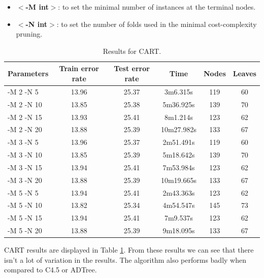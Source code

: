 \documentclass[a4paper]{llncs}
\begin{document}
\begin{itemize}
  \item \textbf{$<$-M int$>$}: to set the minimal number of instances at the terminal nodes.
  \item \textbf{$<$-N int$>$}: to set the number of folds used in the minimal cost-complexity pruning.
\end{itemize}

\begin{table}[ht]
  \begin{center}
  \begin{tabular}{ | l | c | c | c | c | c |}
    \hline
    \textbf{Parameters} & \textbf{Train error rate} & \textbf{Test error rate} & \textbf{Time} & \textbf{Nodes} & \textbf{Leaves} \\ \hline
    -M 2 -N 5 & 13.96 & 25.37 & 3m6.315s & 119 & 60 \\ \hline
    -M 2 -N 10 & 13.85 & 25.38 & 5m36.925s & 139 & 70 \\ \hline
    -M 2 -N 15 & 13.93 & 25.41 & 8m1.214s & 123 & 62 \\ \hline
    -M 2 -N 20 & 13.88 & 25.39 & 10m27.982s & 133 & 67 \\ \hline
    
    -M 3 -N 5 & 13.96 & 25.37 & 2m51.491s & 119 & 60 \\ \hline
    -M 3 -N 10 & 13.85 & 25.39 & 5m18.642s & 139 & 70 \\ \hline
    -M 3 -N 15 & 13.94 & 25.41 & 7m53.984s & 123 & 62 \\ \hline
    -M 3 -N 20 & 13.88 & 25.39 & 10m19.665s & 133 & 67 \\ \hline
    
    -M 5 -N 5 & 13.94 & 25.41 & 2m43.363s & 123 & 62 \\ \hline
    -M 5 -N 10 & 13.82 & 25.34 & 4m54.547s & 145 & 73 \\ \hline
    -M 5 -N 15 & 13.94 & 25.41 & 7m9.537s & 123 & 62 \\ \hline
    -M 5 -N 20 & 13.88 & 25.39 & 9m18.095s & 133 & 67 \\ \hline
  \end{tabular}
  \caption{Results for CART.}
  \label{tbl:results_cart}
  \end{center}
\end{table}

CART results are displayed in Table \ref{tbl:results_cart}.
From these results we can see that there isn't a lot of variation in the results.
The algorithm also performs badly when compared to C4.5 or ADTree.
\end{document}
